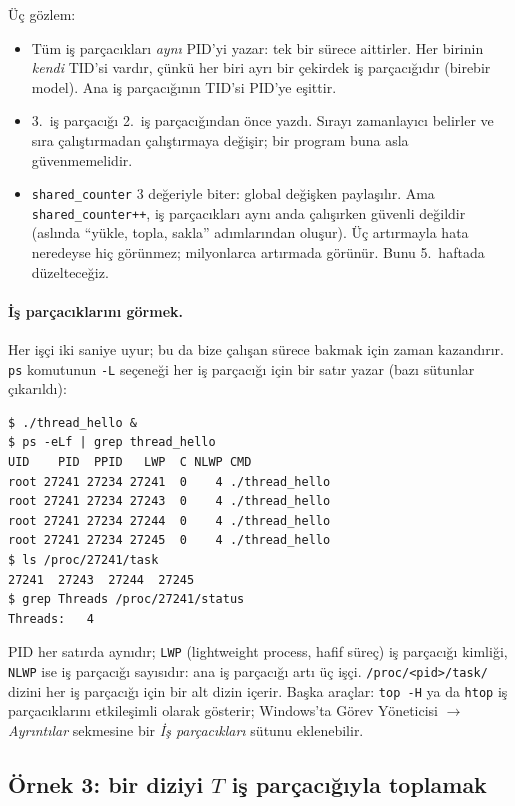 \documentclass[11pt,a4paper]{article}
\newcommand{\cmd}[1]{\texttt{#1}}
\begin{document}
Üç gözlem:
\begin{itemize}
  \item Tüm iş parçacıkları \emph{aynı} PID'yi yazar: tek bir sürece aittirler. Her birinin \emph{kendi} TID'si vardır, çünkü her biri ayrı bir çekirdek iş parçacığıdır (birebir model). Ana iş parçacığının TID'si PID'ye eşittir.
  \item 3.~iş parçacığı 2.~iş parçacığından önce yazdı. Sırayı zamanlayıcı belirler ve sıra çalıştırmadan çalıştırmaya değişir; bir program buna asla güvenmemelidir.
  \item \cmd{shared\_counter} $3$ değeriyle biter: global değişken paylaşılır. Ama \cmd{shared\_counter++}, iş parçacıkları aynı anda çalışırken güvenli değildir (aslında ``yükle, topla, sakla'' adımlarından oluşur). Üç artırmayla hata neredeyse hiç görünmez; milyonlarca artırmada görünür. Bunu 5.~haftada düzelteceğiz.
\end{itemize}

\paragraph{İş parçacıklarını görmek.} Her işçi iki saniye uyur; bu da bize çalışan sürece bakmak için zaman kazandırır. \cmd{ps} komutunun \cmd{-L} seçeneği her iş parçacığı için bir satır yazar (bazı sütunlar çıkarıldı):

\begin{lstlisting}[style=term]
$ ./thread_hello &
$ ps -eLf | grep thread_hello
UID    PID  PPID   LWP  C NLWP CMD
root 27241 27234 27241  0    4 ./thread_hello
root 27241 27234 27243  0    4 ./thread_hello
root 27241 27234 27244  0    4 ./thread_hello
root 27241 27234 27245  0    4 ./thread_hello
$ ls /proc/27241/task
27241  27243  27244  27245
$ grep Threads /proc/27241/status
Threads:   4
\end{lstlisting}

PID her satırda aynıdır; \texttt{LWP} (lightweight process, hafif süreç) iş parçacığı kimliği, \texttt{NLWP} ise iş parçacığı sayısıdır: ana iş parçacığı artı üç işçi. \cmd{/proc/<pid>/task/} dizini her iş parçacığı için bir alt dizin içerir. Başka araçlar: \cmd{top -H} ya da \cmd{htop} iş parçacıklarını etkileşimli olarak gösterir; Windows'ta Görev Yöneticisi $\to$ \emph{Ayrıntılar} sekmesine bir \emph{İş parçacıkları} sütunu eklenebilir.

\subsection{Örnek 3: bir diziyi $T$ iş parçacığıyla toplamak}
\label{sec:arraysum}
\end{document}
